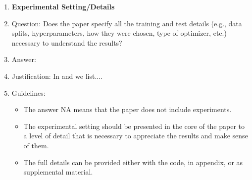 \begin{enumerate}
\item {\bf Experimental Setting/Details}
\item[] Question: Does the paper specify all the training and test details (e.g., data splits, hyperparameters, how they were chosen, type of optimizer, etc.) necessary to understand the results?
\item[] Answer: \answerYes{} %
\item[] Justification: \justificationTODO{}
  In  and  we list....
\item[] Guidelines:
  \begin{itemize}
  \item The answer NA means that the paper does not include experiments.
  \item The experimental setting should be presented in the core of the paper to a level of detail that is necessary to appreciate the results and make sense of them.
  \item The full details can be provided either with the code, in appendix, or as supplemental material.
  \end{itemize}


\end{enumerate}
